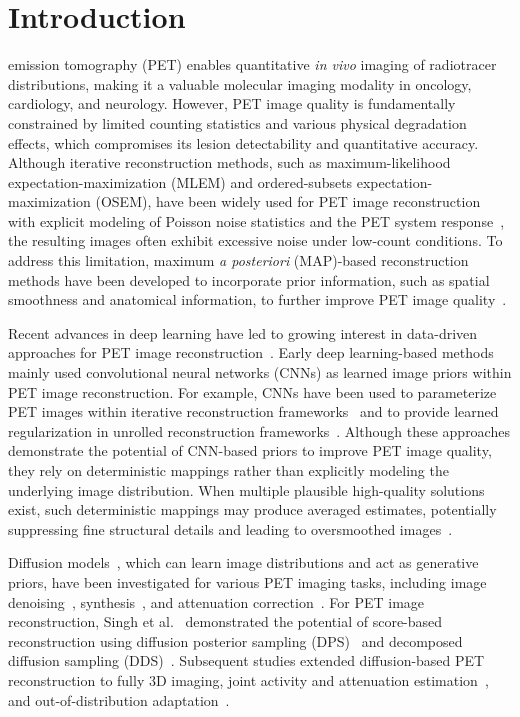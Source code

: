 \documentclass[journal]{IEEEtran}
\begin{document}
\section{Introduction}
\label{sec:introduction}
 emission tomography (PET) enables quantitative \textit{in vivo} imaging of radiotracer distributions, making it a valuable molecular imaging modality in oncology, cardiology, and neurology. However, PET image quality is fundamentally constrained by limited counting statistics and various physical degradation effects, which compromises its lesion detectability and quantitative accuracy. Although iterative reconstruction methods, such as maximum-likelihood expectation-maximization (MLEM) and ordered-subsets expectation-maximization (OSEM), have been widely used for PET image reconstruction with explicit modeling of Poisson noise statistics and the PET system response~\cite{Shepp1982,Hudson1994}, the resulting images often exhibit excessive noise under low-count conditions. To address this limitation, maximum \textit{a posteriori} (MAP)-based reconstruction methods have been developed to incorporate prior information, such as spatial smoothness and anatomical information, to further improve PET image quality~\cite{Green1990,DePierro1995,Nuyts2003,Qi2006,Qi2000}.

Recent advances in deep learning have led to growing interest in data-driven approaches for PET image reconstruction~\cite{Reader2020,Hashimoto2024Review,miwa2025innovations}. Early deep learning-based methods mainly used convolutional neural networks (CNNs) as learned image priors within PET image reconstruction. For example, CNNs have been used to parameterize PET images within iterative reconstruction frameworks~\cite{Gong2019} and to provide learned regularization in unrolled reconstruction frameworks~\cite{Mehranian2021}. Although these approaches demonstrate the potential of CNN-based priors to improve PET image quality, they rely on deterministic mappings rather than explicitly modeling the underlying image distribution. When multiple plausible high-quality solutions exist, such deterministic mappings may produce averaged estimates, potentially suppressing fine structural details and leading to oversmoothed images~\cite{Whang_2022_CVPR,Saharia2023}. 

Diffusion models~\cite{Ho2020,Song2021SDE}, which can learn image distributions and act as generative priors, have been investigated for various PET imaging tasks, including image denoising~\cite{Gong2024DDPM,Pan2024PETCM,Yu2025DDPM,Xie2026DDPET}, synthesis~\cite{Xie2024,Yuxin2026}, and attenuation correction~\cite{Chen2025AC,jeong2026gpdm}. For PET image reconstruction, Singh et al.~\cite{singh_2024} demonstrated the potential of score-based reconstruction using diffusion posterior sampling (DPS)~\cite{chung2023diffusion} and decomposed diffusion sampling (DDS)~\cite{chung2024decomposed}. Subsequent studies extended diffusion-based PET reconstruction to fully 3D imaging\cite{webber2025lisch}, joint activity and attenuation estimation~\cite{bae2025joint,PhungMLAA}, and out-of-distribution adaptation~\cite{Hashimoto2026,yilmaz2026petadaptertesttimedomainadaptation}.
\end{document}
